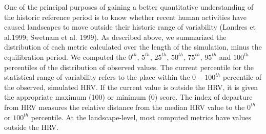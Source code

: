 One of the principal purposes of gaining a better quantitative understanding of the historic reference period is to know whether recent human activities have caused landscapes to move outside their historic range of variability (Landres et al.1999; Swetnam et al. 1999). As described above, we summarized the distribution of each metric calculated over the length of the simulation, minus the equilibration period. We computed the $0^{th}$, $5^{th}$, $25^{th}$, $50^{th}$, $75^{th}$, $95^{th}$ and $100^{th}$ percentiles of the distribution of observed values. The current percentile for the statistical range of variability refers to the place within the $0-100^{th}$ percentile of the observed, simulated HRV. If the current value is outside the HRV, it is given the appropriate maximum (100) or minimum (0) score. The index of departure from HRV measures the relative distance from the median HRV value to the $0^{th}$ or $100^{th}$ percentile. At the landscape-level, most computed metrics have values outside the HRV. 


